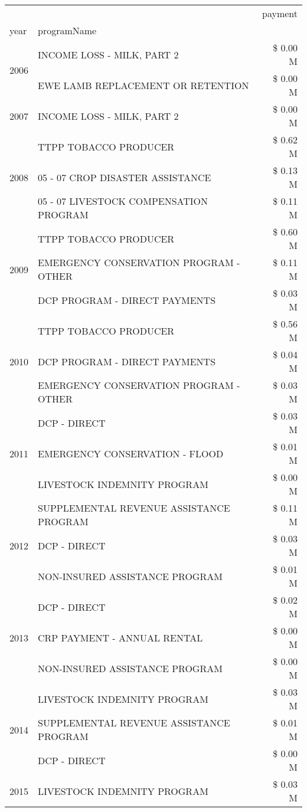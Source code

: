 \begin{tabular}{llr}
\toprule
 &  & payment \\
year & programName &  \\
\midrule
\multirow[t]{2}{*}{2006} & INCOME LOSS - MILK, PART 2 & \$ 0.00 M \\
 & EWE LAMB REPLACEMENT OR RETENTION & \$ 0.00 M \\
\cline{1-3}
2007 & INCOME LOSS - MILK, PART 2 & \$ 0.00 M \\
\cline{1-3}
\multirow[t]{3}{*}{2008} & TTPP TOBACCO PRODUCER & \$ 0.62 M \\
 & 05 - 07 CROP DISASTER ASSISTANCE & \$ 0.13 M \\
 & 05 - 07 LIVESTOCK COMPENSATION PROGRAM & \$ 0.11 M \\
\cline{1-3}
\multirow[t]{3}{*}{2009} & TTPP TOBACCO PRODUCER & \$ 0.60 M \\
 & EMERGENCY CONSERVATION PROGRAM - OTHER & \$ 0.11 M \\
 & DCP PROGRAM - DIRECT PAYMENTS & \$ 0.03 M \\
\cline{1-3}
\multirow[t]{3}{*}{2010} & TTPP TOBACCO PRODUCER & \$ 0.56 M \\
 & DCP PROGRAM - DIRECT PAYMENTS & \$ 0.04 M \\
 & EMERGENCY CONSERVATION PROGRAM - OTHER & \$ 0.03 M \\
\cline{1-3}
\multirow[t]{3}{*}{2011} & DCP - DIRECT & \$ 0.03 M \\
 & EMERGENCY CONSERVATION - FLOOD & \$ 0.01 M \\
 & LIVESTOCK INDEMNITY PROGRAM & \$ 0.00 M \\
\cline{1-3}
\multirow[t]{3}{*}{2012} & SUPPLEMENTAL REVENUE ASSISTANCE PROGRAM & \$ 0.11 M \\
 & DCP - DIRECT & \$ 0.03 M \\
 & NON-INSURED ASSISTANCE PROGRAM & \$ 0.01 M \\
\cline{1-3}
\multirow[t]{3}{*}{2013} & DCP - DIRECT & \$ 0.02 M \\
 & CRP PAYMENT - ANNUAL RENTAL & \$ 0.00 M \\
 & NON-INSURED ASSISTANCE PROGRAM & \$ 0.00 M \\
\cline{1-3}
\multirow[t]{3}{*}{2014} & LIVESTOCK INDEMNITY PROGRAM & \$ 0.03 M \\
 & SUPPLEMENTAL REVENUE ASSISTANCE PROGRAM & \$ 0.01 M \\
 & DCP - DIRECT & \$ 0.00 M \\
\cline{1-3}
\multirow[t]{3}{*}{2015} & LIVESTOCK INDEMNITY PROGRAM & \$ 0.03 M \\

\end{tabular}
